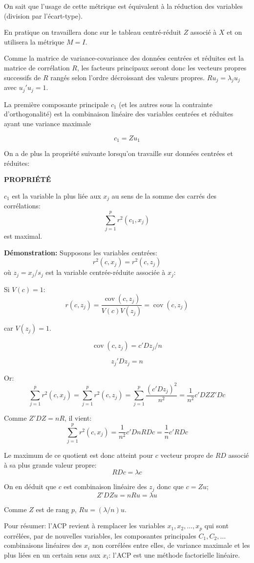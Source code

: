 \documentclass[12pt,a4paper]{article}
\begin{document}
On sait que l'usage de cette métrique est équivalent à la réduction des variables (division
par l'écart-type).

En pratique on travaillera donc sur le tableau centré-réduit $Z$ associé à $X$ et on utilisera la
métrique $M = I$.

Comme la matrice de variance-covariance des données centrées et réduites est la matrice de corrélation $R$, les facteurs principaux seront donc les vecteurs propres successifs de
$R$ rangés selon l'ordre décroissant des valeurs propres. $R u_j = \lambda_j u_j$ avec $u_j' u_j = 1$.

La première composante principale $c_1$ (et les autres sous la contrainte d'orthogonalité)
est la combinaison linéaire des variables centrées et réduites ayant une variance maximale

\[c_1 = Z u_1\]

On a de plus la propriété suivante lorsqu'on travaille sur données centrées et réduites:

\textbf{PROPRIÉTÉ}

$c_1$ est la variable la plus liée aux $x_j$ au sens de la somme des carrés des corrélations:
\[\sum_{j=1}^p r^2(c_1, x_j)\] est maximal.

\textbf{Démonstration:} Supposons les variables centrées:
\[r^2(c, x_j) = r^2(c, z_j)\] où $z_j = x_j/s_j$ est la variable centrée-réduite associée à $x_j$:

Si $V(c) = 1$:
\[r(c, z_j) = \frac{\operatorname{cov}(c, z_j)}{V(c) V(z_j)} = \operatorname{cov}(c, z_j)\]

car $V(z_j) = 1$.

\[ \operatorname{cov}(c, z_j) = c' D z_j / n \]

\[z_j' D z_j = n\]

Or:
\[\sum_{j=1}^p r^2(c, x_j) = \sum_{j=1}^p r^2(c, z_j) = \sum_{j=1}^p \frac{(c' D z_j)^2}{n^2} = \frac{1}{n^2} c' D Z Z' D c\]

Comme $Z' D Z = n R$, il vient:
\[\sum_{j=1}^p r^2(c, x_j) = \frac{1}{n^2} c' D n R D c = \frac{1}{n} c' R D c\]

Le maximum de ce quotient est donc atteint pour $c$ vecteur propre de $R D$ associé à sa plus
grande valeur propre:
\[R D c = \lambda c\]

On en déduit que $c$ est combinaison linéaire des $z_j$ donc que $c = Z u$;
\[Z' D Z u = n R u = \lambda u\]

Comme $Z$ est de rang $p$, $R u = (\lambda/n) u$.

Pour résumer: l'ACP revient à remplacer les variables $x_1, x_2, \dots, x_p$ qui sont corrélées,
par de nouvelles variables, les composantes principales $C_1, C_2, \dots$ combinaisons linéaires
des $x_i$ non corrélées entre elles, de variance maximale et les plus liées en un certain sens
aux $x_i$: l'ACP est une méthode factorielle linéaire.
\end{document}
